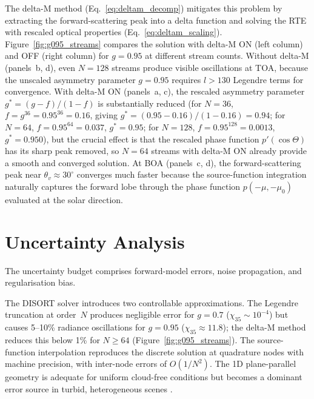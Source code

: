 \documentclass[a4paper, 11pt]{article}
\begin{document}
The delta-M method (Eq.~\ref{eq:deltam_decomp}) mitigates this
problem by extracting the forward-scattering peak into a delta
function and solving the RTE with rescaled optical properties
(Eq.~\ref{eq:deltam_scaling}).  Figure~\ref{fig:g095_streams}
compares the solution with delta-M ON (left column) and OFF (right
column) for $g = 0.95$ at different stream counts.  Without delta-M
(panels~b, d), even $N = 128$ streams produce visible oscillations at
TOA, because the unscaled asymmetry parameter $g = 0.95$ requires
$l > 130$ Legendre terms for convergence.  With delta-M ON (panels~a,
c), the rescaled asymmetry parameter $g^* = (g - f)/(1 - f)$ is
substantially reduced (for $N = 36$, $f = g^{36} = 0.95^{36} = 0.16$,
giving $g^* = (0.95 - 0.16)/(1 - 0.16) = 0.94$; for $N = 64$,
$f = 0.95^{64} = 0.037$, $g^* = 0.95$; for $N = 128$,
$f = 0.95^{128} = 0.0013$, $g^* = 0.950$), but the crucial effect is
that the rescaled phase function $p'(\cos\Theta)$ has its sharp peak
removed, so $N = 64$ streams with delta-M ON already provide a smooth
and converged solution.  At BOA (panels~c, d), the forward-scattering
peak near $\theta_v \approx 30^{\circ}$ converges much faster because
the source-function integration naturally captures the forward lobe
through the phase function $p(-\mu, -\mu_0)$ evaluated at the solar
direction.


\section{Uncertainty Analysis}
\label{sec:uncertainty}

The uncertainty budget comprises forward-model errors, noise propagation, and regularisation bias.

The DISORT solver introduces two controllable approximations.  The Legendre truncation at order~$N$ produces negligible error for $g = 0.7$ ($\chi_{35} \sim 10^{-4}$) but causes 5--10\% radiance oscillations for $g = 0.95$ ($\chi_{35} \approx 11.8$); the delta-M method reduces this below 1\% for $N \geq 64$ (Figure~\ref{fig:g095_streams}).  The source-function interpolation reproduces the discrete solution at quadrature nodes with machine precision, with inter-node errors of $O(1/N^2)$.  The 1D plane-parallel geometry is adequate for uniform cloud-free conditions but becomes a dominant error source in turbid, heterogeneous scenes \cite{thomas2002}.
\end{document}
